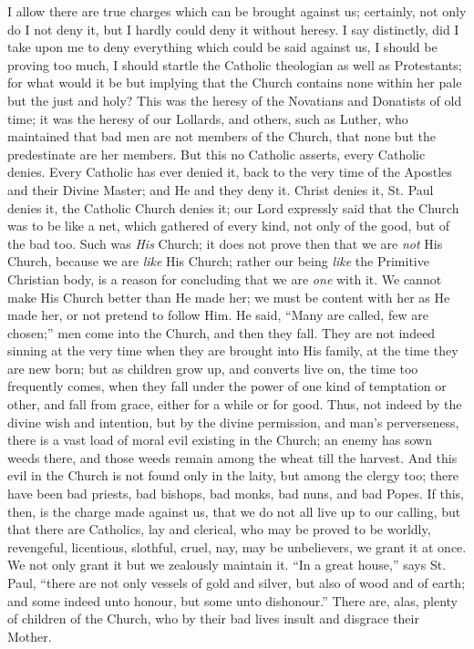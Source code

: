 I allow there are true charges which can be brought
against us; certainly, not only do I not deny it, but I
hardly could deny it without heresy. I say distinctly,
did I take upon me to deny everything which could be said
against us, I should be proving too much, I should
startle the Catholic theologian as well as Protestants;
for what would it be but implying that the Church
contains none within her pale but the just and holy? This
was the heresy of the Novatians and Donatists of old
time; it was the heresy of our Lollards, and others, such
as Luther, who maintained that bad men are not members of
the Church, that none but the predestinate are her
members. But this no Catholic asserts, every Catholic
denies. Every Catholic has ever denied it, back to the
very time of the Apostles and their Divine Master; and He
and they deny it. Christ denies it, St. Paul denies it,
the Catholic Church denies it; our Lord expressly said
that the Church was to be like a net, which gathered of
every kind, not only of the good, but of the bad too.
Such was \emph{His} Church; it does not prove then that
we are \emph{not} His Church, because we are \emph{like}
His Church; rather our being \emph{like} the Primitive
Christian body, is a reason for concluding that we are \emph{one}
with it. We cannot make His Church better than He made
her; we must be content with her as He made her, or not
pretend to follow Him. He said, ``Many are called,
few are chosen;'' men come into the Church, and then
they fall. They are not indeed sinning at the very time
when they are brought into His family, at the time they
are new born; but as children grow up, and converts live
on, the time too frequently comes, when they fall under
the power of one kind of temptation or other, and fall
from grace, either for a while or for good. Thus, not
indeed by the divine wish and intention, but by the
divine permission, and man's perverseness, there is a
vast load of moral evil existing in the Church; an enemy
has sown weeds there, and those weeds remain among the
wheat till the harvest. And this evil in the Church is
not found only in the laity, but among the clergy too;
there have been bad priests, bad bishops, bad monks, bad
nuns, and bad Popes. If this, then, is the charge made
against us, that we do not all live up to our calling,
but that there are Catholics, lay and clerical, who may
be proved to be worldly, revengeful, licentious,
slothful, cruel, nay, may be unbelievers, we grant it at
once. We not only grant it but we zealously maintain it.
``In a great house,'' says St. Paul, ``there
are not only vessels of gold and silver, but also of wood
and of earth; and some indeed unto honour, but some unto
dishonour.'' There are, alas, plenty of children of
the Church, who by their bad lives insult and disgrace
their Mother.


